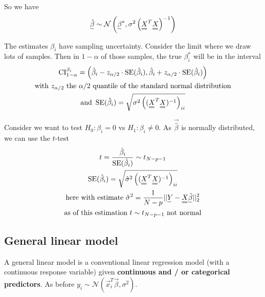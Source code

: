 
So we have
\begin{equation}
    \vec{\hat{\beta}} \sim \mathcal{N}\left(\vec{\beta}^*, \sigma^2 \left(\mat{X}^T \mat{X}\right)^{-1}\right)
\end{equation}

The estimates $\beta_i$ have sampling uncertainty. Consider
the limit where we draw lots of samples. Then in $1-\alpha$
of those samples, the true $\beta_i^*$ will be in the interval
\begin{equation}
    \begin{gathered}
        \operatorname{CI}_{1-\alpha}^{\beta_i} = \left( \hat{\beta}_i - z_{\alpha/2} \cdot \operatorname{SE}( \hat{\beta}_i ), \hat{\beta}_i + z_{\alpha/2} \cdot \operatorname{SE}( \hat{\beta}_i ) \right) \\
        \text{with } z_{\alpha/2} \text{ the } \alpha/2 \text{ quantile of the standard normal distribution} \\
        \text{and } \operatorname{SE}( \hat{\beta}_i ) = \sqrt{\sigma^2 \left( (\mat{X}^T \mat{X})^{-1} \right)_{ii}}
    \end{gathered}
\end{equation}

Consider we want to test $H_0: \beta_i = 0$ vs $H_1: \beta_i \neq 0$. As $\vec{\hat{\beta}}$ is normally distributed, we can use the $t$-test
\begin{equation}
    \begin{gathered}
        t = \frac{\hat{\beta}_i}{\operatorname{SE}(\hat{\beta}_i)} \sim t_{N-p-1} \\
       \operatorname{SE}(\hat{\beta}_i) = \sqrt{\hat{\sigma}^2 \left( (\mat{X}^T \mat{X})^{-1} \right)_{ii}} \\
       \text{here with estimate } \hat{\sigma}^2 = \frac{1}{N-p} ||\vec{Y} - \mat{X} \vec{\hat{\beta}}||_2^2 \\
       \text{as of this estimation } t \sim t_{N-p-1} \text{ not normal}
    \end{gathered}
\end{equation}

\subsection{General linear model}
A general linear model is a conventional linear regression model
(with a continuous response variable) given \textbf{continuous and / or
categorical predictors}. As before $y_i \sim \mathcal{N}(\vec{x}_i^T \vec{\beta}, \sigma^2)$.

